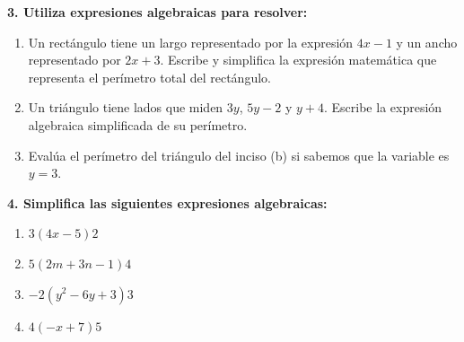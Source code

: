 \documentclass[11pt, a4paper]{article}
\begin{document}

\noindent \textbf{3. Utiliza expresiones algebraicas para resolver:}
\begin{enumerate}[label=\alph*), itemsep=0.4cm]
    \item Un rectángulo tiene un largo representado por la expresión $4x - 1$ y un ancho representado por $2x + 3$. Escribe y simplifica la expresión matemática que representa el perímetro total del rectángulo.
    \item Un triángulo tiene lados que miden $3y$, $5y - 2$ y $y + 4$. Escribe la expresión algebraica simplificada de su perímetro.
    \item Evalúa el perímetro del triángulo del inciso (b) si sabemos que la variable es $y = 3$.
\end{enumerate}

\vspace{0.6cm}

\noindent \textbf{4. Simplifica las siguientes expresiones algebraicas:}
\begin{enumerate}[label=\alph*), itemsep=0.4cm]
    \item $3(4x - 5)2$
    \item $5(2m + 3n - 1)4$
    \item $-2(y^2 - 6y + 3)3$
    \item $4(-x + 7)5$
\end{enumerate}
\end{document}
